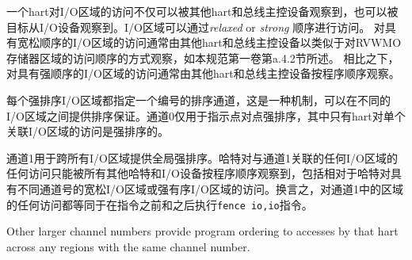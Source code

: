 {\iffalse
Accesses by one hart to an I/O region are observable not only by other harts
and bus mastering devices but also by targeted slave I/O devices, and I/O
regions may be accessed with either {\em relaxed} or {\em strong} ordering.
Accesses to an I/O region with relaxed ordering are generally observed by
other harts and bus mastering devices in a manner similar to the ordering of
accesses to an RVWMO memory region, as discussed in Section A.4.2 in Volume
I of this specification.
By contrast, accesses to an I/O region with strong ordering are generally
observed by other harts and bus mastering devices in program order.
\fi
一个hart对I/O区域的访问不仅可以被其他hart和总线主控设备观察到，也可以被目标从I/O设备观察到。I/O区域可以通过{\em relaxed} or {\em strong} 顺序进行访问。
对具有宽松顺序的I/O区域的访问通常由其他hart和总线主控设备以类似于对RVWMO存储器区域的访问顺序的方式观察，如本规范第一卷第a.4.2节所述。
相比之下，对具有强顺序的I/O区域的访问通常由其他hart和总线主控设备按程序顺序观察。

\iffalse
Each strongly ordered I/O region specifies a numbered ordering
channel, which is a mechanism by which ordering guarantees can be
provided between different I/O regions.  Channel 0 is used to indicate
point-to-point strong ordering only, where only accesses by the hart to the
single associated I/O region are strongly ordered.
\fi
每个强排序I/O区域都指定一个编号的排序通道，这是一种机制，可以在不同的I/O区域之间提供排序保证。通道0仅用于指示点对点强排序，其中只有hart对单个关联I/O区域的访问是强排序的。

\iffalse
Channel 1 is used to provide global strong ordering across all I/O
regions.  Any accesses by a hart to any I/O region associated with
channel 1 can only be observed to have occurred in program order by all
other harts and I/O devices, including relative to accesses made by
that hart to relaxed I/O regions or strongly ordered I/O regions with
different channel numbers.  In other words, any access to a region in
channel 1 is equivalent to executing a {\tt fence io,io}
instruction before and after the instruction.
\fi
通道1用于跨所有I/O区域提供全局强排序。哈特对与通道1关联的任何I/O区域的任何访问只能被所有其他哈特和I/O设备按程序顺序观察到，包括相对于哈特对具有不同通道号的宽松I/O区域或强有序I/O区域的访问。换言之，对通道1中的区域的任何访问都等同于在指令之前和之后执行{\tt fence io,io}指令。

\iffalse
Other larger channel numbers provide program ordering to accesses by
that hart across any regions with the same channel number.

}
